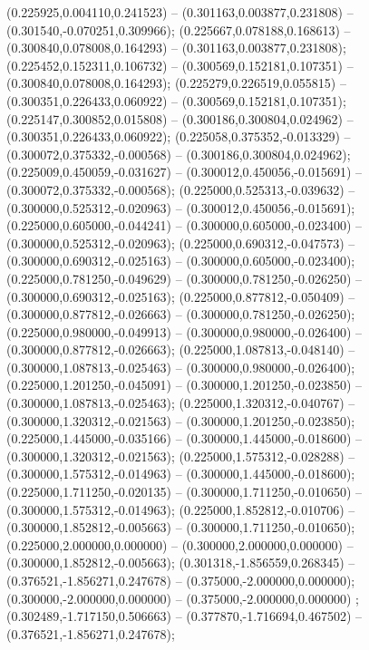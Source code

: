  (0.225925,0.004110,0.241523) -- (0.301163,0.003877,0.231808) -- (0.301540,-0.070251,0.309966);
 (0.225667,0.078188,0.168613) -- (0.300840,0.078008,0.164293) -- (0.301163,0.003877,0.231808);
 (0.225452,0.152311,0.106732) -- (0.300569,0.152181,0.107351) -- (0.300840,0.078008,0.164293);
 (0.225279,0.226519,0.055815) -- (0.300351,0.226433,0.060922) -- (0.300569,0.152181,0.107351);
 (0.225147,0.300852,0.015808) -- (0.300186,0.300804,0.024962) -- (0.300351,0.226433,0.060922);
 (0.225058,0.375352,-0.013329) -- (0.300072,0.375332,-0.000568) -- (0.300186,0.300804,0.024962);
 (0.225009,0.450059,-0.031627) -- (0.300012,0.450056,-0.015691) -- (0.300072,0.375332,-0.000568);
 (0.225000,0.525313,-0.039632) -- (0.300000,0.525312,-0.020963) -- (0.300012,0.450056,-0.015691);
 (0.225000,0.605000,-0.044241) -- (0.300000,0.605000,-0.023400) -- (0.300000,0.525312,-0.020963);
 (0.225000,0.690312,-0.047573) -- (0.300000,0.690312,-0.025163) -- (0.300000,0.605000,-0.023400);
 (0.225000,0.781250,-0.049629) -- (0.300000,0.781250,-0.026250) -- (0.300000,0.690312,-0.025163);
 (0.225000,0.877812,-0.050409) -- (0.300000,0.877812,-0.026663) -- (0.300000,0.781250,-0.026250);
 (0.225000,0.980000,-0.049913) -- (0.300000,0.980000,-0.026400) -- (0.300000,0.877812,-0.026663);
 (0.225000,1.087813,-0.048140) -- (0.300000,1.087813,-0.025463) -- (0.300000,0.980000,-0.026400);
 (0.225000,1.201250,-0.045091) -- (0.300000,1.201250,-0.023850) -- (0.300000,1.087813,-0.025463);
 (0.225000,1.320312,-0.040767) -- (0.300000,1.320312,-0.021563) -- (0.300000,1.201250,-0.023850);
 (0.225000,1.445000,-0.035166) -- (0.300000,1.445000,-0.018600) -- (0.300000,1.320312,-0.021563);
 (0.225000,1.575312,-0.028288) -- (0.300000,1.575312,-0.014963) -- (0.300000,1.445000,-0.018600);
 (0.225000,1.711250,-0.020135) -- (0.300000,1.711250,-0.010650) -- (0.300000,1.575312,-0.014963);
 (0.225000,1.852812,-0.010706) -- (0.300000,1.852812,-0.005663) -- (0.300000,1.711250,-0.010650);
 (0.225000,2.000000,0.000000) -- (0.300000,2.000000,0.000000) -- (0.300000,1.852812,-0.005663);
 (0.301318,-1.856559,0.268345) -- (0.376521,-1.856271,0.247678) -- (0.375000,-2.000000,0.000000);
 (0.300000,-2.000000,0.000000) -- (0.375000,-2.000000,0.000000) ;
 (0.302489,-1.717150,0.506663) -- (0.377870,-1.716694,0.467502) -- (0.376521,-1.856271,0.247678);
